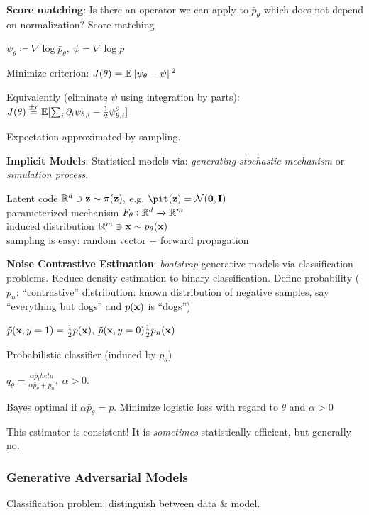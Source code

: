 \textbf{Score matching}: Is there an operator we can apply to $\bar{p}_\theta$ which does not depend on normalization? Score matching

\tab $\psi_\theta\coloneqq\nabla\log \bar{p}_\theta,\> \psi=\nabla \log p$

Minimize criterion: $J(\theta)=\mathbb E \lVert \psi_\theta - \psi \rVert^2$

Equivalently (eliminate $\psi$ using integration by parts):\\
\tab$J(\theta) \overset{\pm c}{=} \mathbb E \lbrack \sum_i \partial_i \psi_{\theta,i}-\frac{1}{2}\psi^2_{\theta,i}\rbrack$

Expectation approximated by sampling.

\textbf{Implicit Models}: Statistical models via: \emph{generating stochastic mechanism} or \emph{simulation process}.

\tab Latent code $\mathbb R^d\ni\mathbf z\sim\pi(\mathbf z),$ e.g. $\pit(\vz)=\cN(\mathbf{0},\vI)$\\
\tab parameterized mechanism $F_\theta: \mathbb R^d\xrightarrow{}\mathbb R^m$\\
\tab induced distribution $\mathbb R^m \ni \mathbf x\sim p_\theta(\mathbf x)$\\
\tab sampling is easy: random vector + forward propagation

\textbf{Noise Contrastive Estimation}: \emph{bootstrap} generative models via classification problems. Reduce density estimation to binary classification. Define probability ($p_n$: ``contrastive'' distribution: known distribution of negative samples, say ``everything but dogs'' and $p(\mathbf x)$ is ``dogs'')

\tab $\Tilde{p} (\mathbf x,y=1)=\frac{1}{2}p(\mathbf x),\> \Tilde{p}(\mathbf x,y=0)\frac{1}{2}p_n(\mathbf x)$

Probabilistic classifier (induced by $\bar{p}_\theta$)

\tab $q_\theta = \frac{\alpha \bar{p}_theta}{\alpha \bar{p}_\theta + p_n},\> \alpha>0$.

Bayes optimal if $\alpha\bar{p}_\theta=p$. Minimize logistic loss with regard to $\theta$ and $\alpha>0$

This estimator is consistent! It is \emph{sometimes} statistically efficient, but generally \underline{no}.

\subsubsection{Generative Adversarial Models}
\label{ssub:gams}

Classification problem: distinguish between data \& model.


